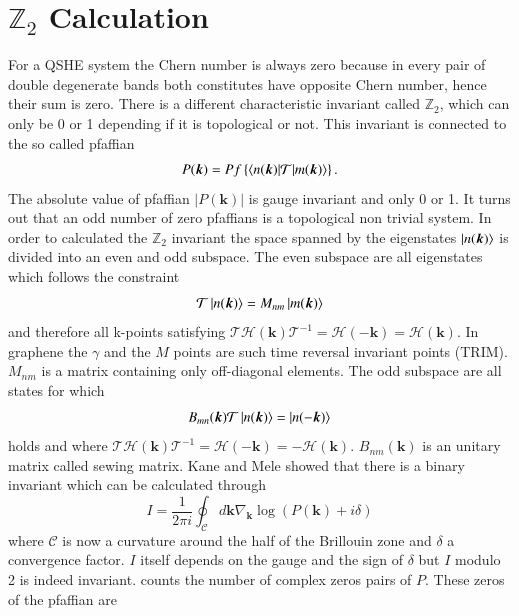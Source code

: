 \documentclass[a4paper,11pt]{report}
\begin{document}
\section{$\mathds{Z}_2$ Calculation}\label{s:z2}

For a QSHE system the Chern number is always zero because in every pair of double degenerate bands both constitutes have opposite Chern number,
hence their sum is zero. There is a different characteristic
invariant called $\mathds{Z}_2$, which can only be 0 or 1 depending if it is topological or not. This invariant is connected to the so called
pfaffian
\begin{equation}
 P(\bm{k}) = Pf\left\{\braket{n(\bm{k})|\mathcal{T}|m(\bm{k})}\right\}.
\end{equation}
The absolute value of pfaffian $\left|P(\bm{k})\right|$ is gauge invariant and only 0 or 1. It turns out that an odd number of zero pfaffians is
a topological non trivial system. In order to calculated the $\mathds{Z}_2$ invariant the space spanned
by the eigenstates $\ket{n(\bm{k})}$ is divided into an even and odd subspace. The even subspace are all eigenstates which follows the constraint
\begin{equation}
 \mathcal{T}\ket{n(\bm{k})} =  M_{nm}\ket{m(\bm{k})}
\end{equation}
and therefore all k-points satisfying $\mathcal{T}\mathcal{H}(\bm{k})\mathcal{T}^{-1} = \mathcal{H}(-\bm{k}) = \mathcal{H}(\bm{k})$. In graphene the
$\gamma$ and the $M$ points are such time reversal invariant points (TRIM). $M_{nm}$ is a
matrix containing only off-diagonal elements. The odd subspace are all states for which
\begin{equation}
 B_{mn}(\bm{k})\mathcal{T}\ket{n(\bm{k})} = \ket{n(-\bm{k})}
\end{equation}
holds and where $\mathcal{T}\mathcal{H}(\bm{k})\mathcal{T}^{-1} = \mathcal{H}(-\bm{k}) = -\mathcal{H}(\bm{k})$. $B_{nm}(\bm{k})$ is an unitary matrix
called sewing matrix. Kane and Mele showed that there is a binary invariant which can be calculated through
\begin{equation}\label{eq:8}
 I = \frac{1}{2\pi i}\oint_{\mathcal{C}} d\bm{k} \nabla_{\bm{k}}\log{\left(P(\bm{k}) + i\delta\right)}
\end{equation}
where $\mathcal{C}$ is now a curvature around the half of the Brillouin zone and $\delta$ a convergence factor. $I$ itself depends on the gauge and
the sign of $\delta$ but $I$ modulo 2 is indeed invariant.  counts the number of complex zeros pairs of $P$. These zeros of the pfaffian are
\end{document}
